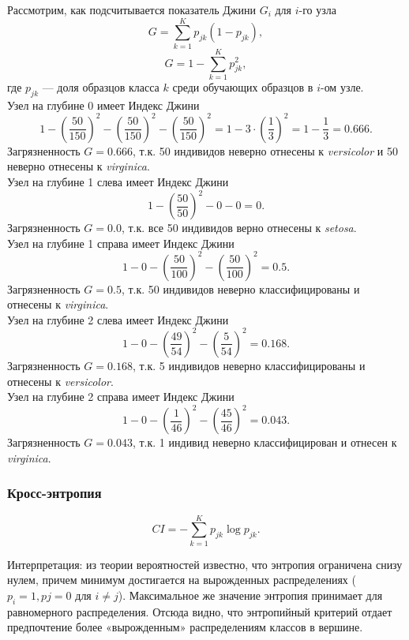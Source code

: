 \documentclass{article}
\begin{document}
Рассмотрим, как подсчитывается показатель Джини $G_i$ для $i$-го узла
$$G = \sum\limits_{k=1}^{K} {p}_{jk}(1-{p}_{jk}),$$
$$G = 1 - \sum\limits_{k=1}^{K} p_{jk}^2,$$
где $p_{jk}$ --- доля образцов класса $k$ среди обучающих образцов в $i$-ом узле.\\

Узел на глубине 0 имеет Индекс Джини
$$1 - \left(\dfrac{50}{150} \right)^2 - \left(\dfrac{50}{150} \right)^2 - \left(\dfrac{50}{150} \right)^2 = 1 - 3 \cdot \left(\dfrac{1}{3} \right)^2 = 1 - \dfrac{1}{3} = 0.666. $$ 
Загрязненность $G = 0.666$, т.к. 50 индивидов неверно отнесены к \textit{versicolor} и 50 неверно отнесены к \textit{virginica}.\\

Узел на глубине 1 слева имеет Индекс Джини
$$1 - \left( \dfrac{50}{50} \right)^2 - 0 - 0 = 0.$$
Загрязненность $G = 0.0$, т.к. все 50 индивидов верно отнесены к \textit{setosa}.\\

Узел на глубине 1 справа имеет Индекс Джини
$$1 - 0 - \left( \dfrac{50}{100} \right)^2 - \left( \dfrac{50}{100} \right)^2 = 0.5. $$
Загрязненность $G = 0.5$, т.к. 50 индивидов неверно классифицированы и отнесены к \textit{virginica}.\\

Узел на глубине 2 слева имеет Индекс Джини
$$1 - 0 - \left( \dfrac{49}{54} \right)^2 - \left( \dfrac{5}{54} \right)^2 = 0.168.$$
Загрязненность $G = 0.168$, т.к. 5 индивидов неверно классифицированы и отнесены к \textit{versicolor}.\\

Узел на глубине 2 справа имеет Индекс Джини
$$1 - 0 - \left( \dfrac{1}{46} \right)^2 - \left( \dfrac{45}{46} \right)^2 = 0.043.$$
Загрязненность $G = 0.043$, т.к. 1 индивид неверно классифицирован и отнесен к \textit{virginica}.

\subsubsection{Кросс-энтропия}

\begin{equation}
	CI = - \sum\limits_{k=1}^{K} {p}_{jk} \log {p}_{jk}.
\end{equation}

Интерпретация: из теории вероятностей известно, что энтропия ограничена снизу нулем, причем минимум достигается на вырожденных распределениях ($p_i = 1, pj = 0$ для $i \neq j$). Максимальное же значение энтропия принимает для равномерного распределения. Отсюда видно, что энтропийный критерий отдает предпочтение более «вырожденным» распределениям классов в вершине.
\end{document}
